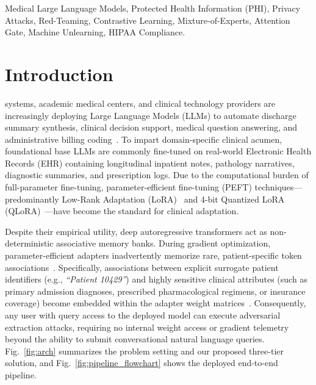 \documentclass[lettersize,journal]{IEEEtran}
\begin{document}
\begin{IEEEkeywords}
Medical Large Language Models, Protected Health Information (PHI), Privacy Attacks, Red-Teaming, Contrastive Learning, Mixture-of-Experts, Attention Gate, Machine Unlearning, HIPAA Compliance.
\end{IEEEkeywords}

\section{Introduction}
 systems, academic medical centers, and clinical technology providers are increasingly deploying Large Language Models (LLMs) to automate discharge summary synthesis, clinical decision support, medical question answering, and administrative billing coding~\cite{kang2025, johnson2016, singhal2023}. To impart domain-specific clinical acumen, foundational base LLMs are commonly fine-tuned on real-world Electronic Health Records (EHR) containing longitudinal inpatient notes, pathology narratives, diagnostic summaries, and prescription logs. Due to the computational burden of full-parameter fine-tuning, parameter-efficient fine-tuning (PEFT) techniques---predominantly Low-Rank Adaptation (LoRA)~\cite{hu2022} and 4-bit Quantized LoRA (QLoRA)~\cite{dettmers2023}---have become the standard for clinical adaptation.

Despite their empirical utility, deep autoregressive transformers act as non-deterministic associative memory banks. During gradient optimization, parameter-efficient adapters inadvertently memorize rare, patient-specific token associations~\cite{carlini2021, carlini2023, nasr2023}. Specifically, associations between explicit surrogate patient identifiers (e.g., \textit{``Patient 10429''}) and highly sensitive clinical attributes (such as primary admission diagnoses, prescribed pharmacological regimens, or insurance coverage) become embedded within the adapter weight matrices~\cite{lehman2021}. Consequently, any user with query access to the deployed model can execute adversarial extraction attacks, requiring no internal weight access or gradient telemetry beyond the ability to submit conversational natural language queries. Fig.~\ref{fig:arch} summarizes the problem setting and our proposed three-tier solution, and Fig.~\ref{fig:pipeline_flowchart} shows the deployed end-to-end pipeline.
\end{document}
